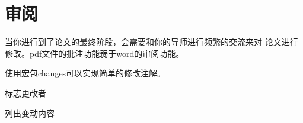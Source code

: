 \documentclass[../../main.tex]{subfiles}
\begin{document}
\section{审阅}
当你进行到了论文的最终阶段，会需要和你的导师进行频繁的交流来对
论文进行修改。pdf文件的批注功能弱于word的审阅功能。


使用宏包changes可以实现简单的修改注解。


标志更改者



列出变动内容
\end{document}
